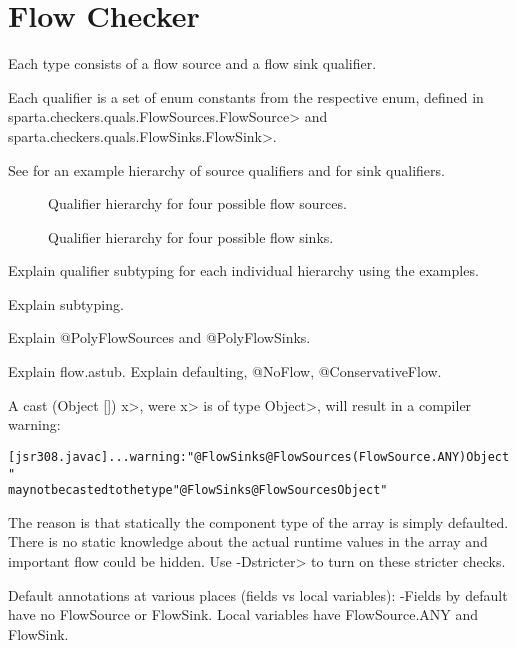 \htmlhr
\chapter{Flow Checker\label{flow-checker}}

Each type consists of a flow source and a flow sink qualifier.

Each qualifier is a set of enum constants from the respective enum,
defined in \<sparta.checkers.quals.FlowSources.FlowSource> and
\<sparta.checkers.quals.FlowSinks.FlowSink>.


See  for an example hierarchy of
source qualifiers and  for sink
qualifiers.


\begin{figure}
\caption{Qualifier hierarchy for four possible flow sources.}
\label{fig:flowsources-hierarchy}
\end{figure}

\begin{figure}
\caption{Qualifier hierarchy for four possible flow sinks.}
\label{fig:flowsinks-hierarchy}
\end{figure}


Explain qualifier subtyping for each individual hierarchy using the examples.

Explain subtyping.

Explain @PolyFlowSources and @PolyFlowSinks.

Explain flow.astub.
Explain defaulting, @NoFlow, @ConservativeFlow.

A cast \<(Object []) x>, were \<x> is of type \<Object>, will result
in a compiler warning:

\begin{alltt}
[jsr308.javac] ... warning: "@FlowSinks @FlowSources({FlowSource.ANY}) Object"
       may not be casted to the type "@FlowSinks @FlowSources Object"
\end{alltt}

The reason is that statically the component type of the array is
simply defaulted. There is no static knowledge about the actual
runtime values in the array and important flow could be hidden.
Use \<-Dstricter> to turn on these stricter checks.



Default annotations at various places (fields vs local variables):
-Fields by default have no FlowSource or FlowSink. Local variables have FlowSource.ANY and FlowSink{}.



